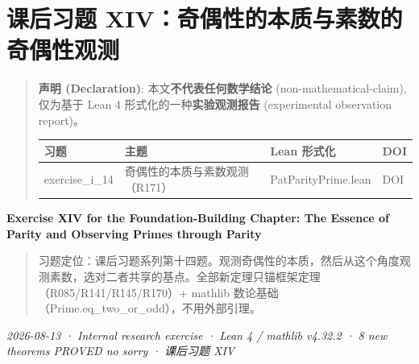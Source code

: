 \documentclass[
]{article}
\author{}
\date{}
\newcounter{none} %
\begin{document}
\section{课后习题
XIV：奇偶性的本质与素数的奇偶性观测}\label{ux7b51ux57faux7bc7ux8bfeux540eux4e60ux9898-xivux5947ux5076ux6027ux7684ux672cux8d28ux4e0eux7d20ux6570ux7684ux5947ux5076ux6027ux89c2ux6d4b}

\begin{quote}
\textbf{声明 (Declaration)}: 本文\textbf{不代表任何数学结论}
(non-mathematical-claim), 仅为基于 Lean 4
形式化的一种\textbf{实验观测报告} (experimental observation report)。

{\def\LTcaptype{none} %
\begin{longtable}[]{@{}
 >{\raggedright\arraybackslash}p{}
 >{\raggedright\arraybackslash}p{}
 >{\raggedright\arraybackslash}p{}
 >{\raggedright\arraybackslash}p{}@{}}
\toprule\noalign{}
\begin{minipage}[b]{\linewidth}\raggedright
习题
\end{minipage} & \begin{minipage}[b]{\linewidth}\raggedright
主题
\end{minipage} & \begin{minipage}[b]{\linewidth}\raggedright
Lean 形式化
\end{minipage} & \begin{minipage}[b]{\linewidth}\raggedright
DOI
\end{minipage} \\
\midrule\noalign{}
\endhead
\bottomrule\noalign{}
\endlastfoot
exercise\_i\_14 & 奇偶性的本质与素数观测（R171） & PatParityPrime.lean &
DOI \\
\end{longtable}
}
\end{quote}

\textbf{Exercise XIV for the Foundation-Building Chapter: The Essence of
Parity and Observing Primes through Parity}

\begin{quote}
习题定位：课后习题系列第十四题。观测奇偶性的本质，然后从这个角度观测素数，选对二者共享的基点。全部新定理只锚框架定理（R085/R141/R145/R170）+
mathlib 数论基础（Prime.eq\_two\_or\_odd），不用外部引理。
\end{quote}

\emph{2026-08-13 · Internal research exercise · Lean 4 / mathlib v4.32.2
· 8 new theorems PROVED no sorry · 课后习题 XIV }
\end{document}
